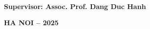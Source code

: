 \hspace*{8mm}\setfontsize{14pt}\textbf{Supervisor: Assoc. Prof. Dang Duc Hanh}\\[0.8cm]

\begin{center}
	\vfill
	\setfontsize{12pt}\textbf{HA NOI – 2025}
\end{center}




